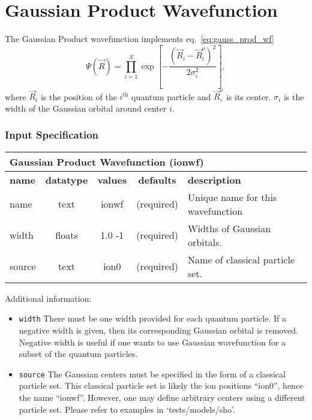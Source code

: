 \section{Gaussian Product Wavefunction}
\label{sec:ionwf}

The Gaussian Product wavefunction implements eq.~\ref{eq:gauss_prod_wf}
\begin{equation}
\Psi(\vec{R}) = \prod_{i=1}^N \exp\left[ -\frac{(\vec{R}_i-\vec{R}_i^o)^2}{2\sigma_i^2} \right]
\label{eq:gauss_prod_wf},
\end{equation}
where $\vec{R}_i$ is the position of the $i^{\text{th}}$ quantum particle and $\vec{R}_i^o$ is its center. $\sigma_i$ is the width of the Gaussian orbital around center $i$.

\subsubsection{Input Specification}

\begin{table}[h]
\begin{center}
\begin{tabular}{l c c c l }
\hline
\multicolumn{5}{l}{Gaussian Product Wavefunction (ionwf)} \\
\hline
\bfseries name & \bfseries datatype & \bfseries values & \bfseries defaults  & \bfseries description \\
\hline
name & text & ionwf & (required) & Unique name for this wavefunction \\
width & floats & 1.0 -1 & (required) & Widths of Gaussian orbitals.\\ 
source & text & ion0 & (required) & Name of classical particle set.\\ 
\hline
\end{tabular}
\end{center}
\end{table}

\FloatBarrier

Additional information:
\begin{itemize}
\item \texttt{width} There must be one width provided for each quantum particle. If a negative width is given, then its corresponding Gaussian orbital is removed. Negative width is useful if one wants to use Gaussian wavefunction for a subset of the quantum particles.
\item \texttt{source} The Gaussian centers must be specified in the form of a classical particle set. This classical particle set is likely the ion positions ``ion0'', hence the name ``ionwf''. However, one may define arbitrary centers using a different particle set. Please refer to examples in `tests/models/sho'.
\end{itemize}

